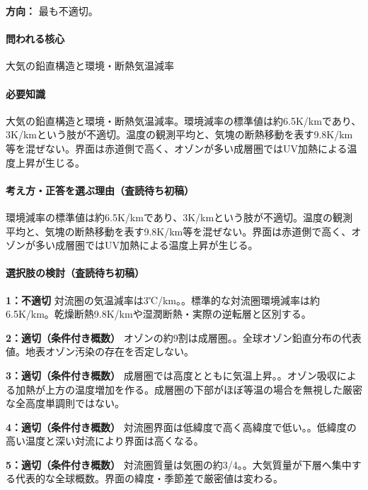 \noindent\textbf{方向：} 最も不適切。\par

\paragraph{問われる核心} 大気の鉛直構造と環境・断熱気温減率

\paragraph{必要知識} 大気の鉛直構造と環境・断熱気温減率。環境減率の標準値は約6.5K/kmであり、3K/kmという肢が不適切。温度の観測平均と、気塊の断熱移動を表す9.8K/km等を混ぜない。界面は赤道側で高く、オゾンが多い成層圏ではUV加熱による温度上昇が生じる。

\paragraph{考え方・正答を選ぶ理由（査読待ち初稿）} 環境減率の標準値は約6.5K/kmであり、3K/kmという肢が不適切。温度の観測平均と、気塊の断熱移動を表す9.8K/km等を混ぜない。界面は赤道側で高く、オゾンが多い成層圏ではUV加熱による温度上昇が生じる。

\paragraph{選択肢の検討（査読待ち初稿）}\mbox{}\par

\noindent\textbf{1：不適切} 対流圏の気温減率は3℃/km。。標準的な対流圏環境減率は約6.5K/km。乾燥断熱9.8K/kmや湿潤断熱・実際の逆転層と区別する。\par

\noindent\textbf{2：適切（条件付き概数）} オゾンの約9割は成層圏。。全球オゾン鉛直分布の代表値。地表オゾン汚染の存在を否定しない。\par

\noindent\textbf{3：適切（条件付き概数）} 成層圏では高度とともに気温上昇。。オゾン吸収による加熱が上方の温度増加を作る。成層圏の下部がほぼ等温の場合を無視した厳密な全高度単調則ではない。\par

\noindent\textbf{4：適切（条件付き概数）} 対流圏界面は低緯度で高く高緯度で低い。。低緯度の高い温度と深い対流により界面は高くなる。\par

\noindent\textbf{5：適切（条件付き概数）} 対流圏質量は気圏の約3/4。。大気質量が下層へ集中する代表的な全球概数。界面の緯度・季節差で厳密値は変わる。\par

